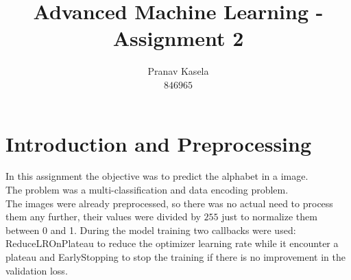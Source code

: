 \documentclass[11pt]{article}
\title{Advanced Machine Learning - Assignment 2}
\author{Pranav Kasela \\$846965$}
\date{}
\begin{document}
\maketitle

\section*{Introduction and Preprocessing}
In this assignment the objective was to predict the alphabet in a image.\\
The problem was a multi-classification and data encoding problem.\\
The images were already preprocessed, so there was no actual need to process them any further, their values were divided by $255$ just to normalize them between 0 and 1. During the model training two callbacks were used: ReduceLROnPlateau to reduce the optimizer learning rate while it encounter a plateau and EarlyStopping to stop the training if there is no improvement in the validation loss.
\end{document}
